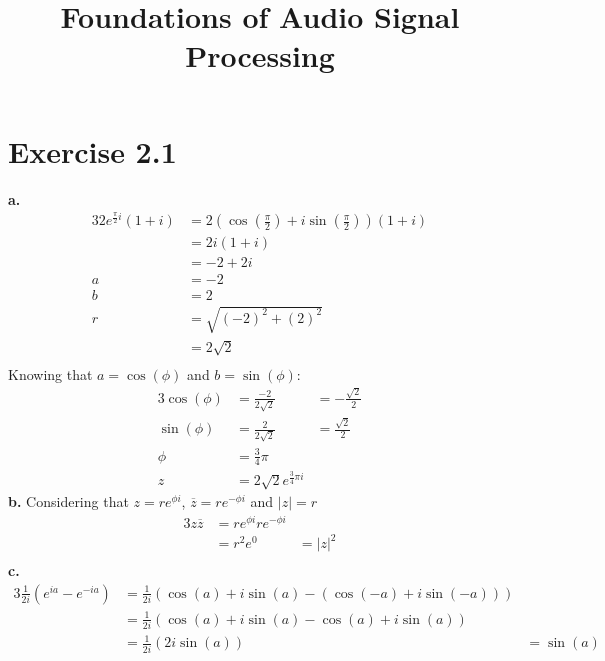 \documentclass[12pt]{article}
\title{Foundations of Audio Signal Processing\\ \ass}
\author{\auth}
\begin{document}
	\maketitle
	\section*{Exercise 2.1}
	\textbf{a.}
	\begin{alignat*}{3}
		2e^{\frac{\pi}{2} i} (1 + i) &= 2 (\cos(\frac{\pi}{2}) + i\sin(\frac{\pi}{2}))(1 + i)\\
		&= 2i (1 + i)\\
		&= -2 + 2i\\
		a &= -2\\
		b &= 2\\
		r &= \sqrt{(-2)^2 + (2)^2}\\
		&= 2\sqrt{2}\\ 
	\end{alignat*}
	Knowing that $a = \cos(\phi)$ and $b = \sin(\phi)$:
	\begin{alignat*}{3}
	\cos(\phi) &= \frac{-2}{2\sqrt{2}} &= -\frac{\sqrt{2}}{2}\\
	\sin(\phi) &= \frac{2}{2\sqrt{2}} &= \frac{\sqrt{2}}{2}\\
	\phi &= \frac{3}{4}\pi\\
	z &= 2 \sqrt{2} e^{\frac{3}{4}\pi i}
	\end{alignat*}
	\textbf{b.} Considering that $z = re^{\phi i}$, $\overline{z} = re^{-\phi i}$ and $|z| = r$
	\begin{alignat*}{3}
	z \overline{z} &= re^{\phi i} re^{- \phi i}\\
	&= r^2 e^0 &= |z|^2\\
	\end{alignat*}
	\textbf{c.}
	\begin{alignat*}{3}
	\frac{1}{2i} (e^{ia} - e^{-ia}) &= \frac{1}{2i} (\cos(a) + i \sin(a) - (\cos(-a) + i \sin(-a)))\\
	&= \frac{1}{2i} (\cos(a) + i \sin(a) - \cos(a) + i \sin(a))\\
	&= \frac{1}{2i} (2 i \sin(a)) &= \sin(a)
	\end{alignat*}
\end{document}
